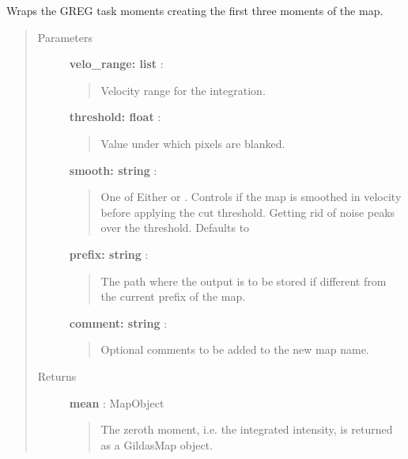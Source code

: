 \documentclass[a4paper,10pt,english]{sphinxmanual}
\begin{document}
\begin{fulllineitems}
\begin{fulllineitems}
\end{fulllineitems}


\begin{fulllineitems}
\label{maps:astrolyze.maps.gildas.GildasMap.moments}
Wraps the GREG task moments creating the first three moments
of the map.
\begin{quote}\begin{description}
\item[{Parameters }] \leavevmode
\textbf{velo\_range: list} :
\begin{quote}

Velocity range for the integration.
\end{quote}

\textbf{threshold: float} :
\begin{quote}

Value under which pixels are blanked.
\end{quote}

\textbf{smooth: string} :
\begin{quote}

One of Either  or . Controls
if the map is smoothed in velocity before applying the cut 
threshold. Getting rid of noise peaks over the threshold.
Defaults to 
\end{quote}

\textbf{prefix: string} :
\begin{quote}

The path where the output is to be stored if different
from the current prefix of the map.
\end{quote}

\textbf{comment: string} :
\begin{quote}

Optional comments to be added to the new map name.
\end{quote}

\item[{Returns }] \leavevmode
\textbf{mean} : MapObject
\begin{quote}

The zeroth moment, i.e. the integrated intensity, is returned as a
GildasMap object.
\end{quote}

\end{description}\end{quote}


\end{fulllineitems}
\end{fulllineitems}
\end{document}
